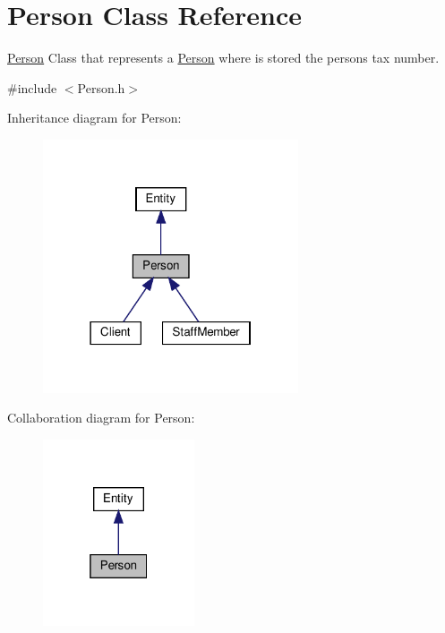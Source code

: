 \hypertarget{classPerson}{}\section{Person Class Reference}
\label{classPerson}


\hyperlink{classPerson}{Person} Class that represents a \hyperlink{classPerson}{Person} where is stored the person\textquotesingle{}s tax number.  




{\ttfamily \#include $<$Person.\+h$>$}



Inheritance diagram for Person\+:
\nopagebreak
\begin{figure}[H]
\begin{center}
\leavevmode
\includegraphics[width=214pt]{classPerson__inherit__graph}
\end{center}
\end{figure}


Collaboration diagram for Person\+:\nopagebreak
\begin{figure}[H]
\begin{center}
\leavevmode
\includegraphics[width=127pt]{classPerson__coll__graph}
\end{center}
\end{figure}
